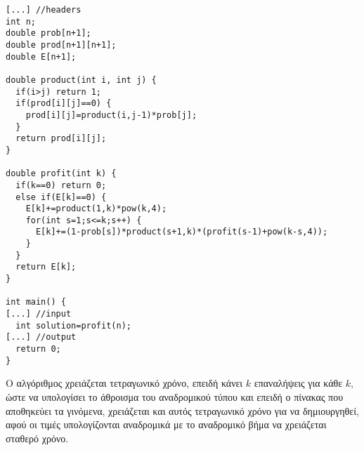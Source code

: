 \documentclass[12pt]{article}
\begin{document}
\latintext\begin{lstlisting}
[...] //headers
int n;
double prob[n+1];
double prod[n+1][n+1];
double E[n+1];

double product(int i, int j) {
  if(i>j) return 1;
  if(prod[i][j]==0) {
    prod[i][j]=product(i,j-1)*prob[j];
  }
  return prod[i][j];
}  

double profit(int k) {
  if(k==0) return 0;
  else if(E[k]==0) {
    E[k]+=product(1,k)*pow(k,4);
    for(int s=1;s<=k;s++) {
      E[k]+=(1-prob[s])*product(s+1,k)*(profit(s-1)+pow(k-s,4));
    }
  }
  return E[k];
}

int main() {
[...] //input
  int solution=profit(n);
[...] //output
  return 0;
}
\end{lstlisting}\greektext
Ο αλγόριθμος χρειάζεται τετραγωνικό χρόνο, επειδή κάνει $k$ επαναλήψεις για κάθε $k$, ώστε να υπολογίσει το άθροισμα του αναδρομικού τύπου και επειδή ο πίνακας που αποθηκεύει τα γινόμενα, χρειάζεται και αυτός τετραγωνικό χρόνο για να δημιουργηθεί, αφού οι τιμές υπολογίζονται αναδρομικά με το αναδρομικό βήμα να χρειάζεται σταθερό χρόνο.
\end{document}
